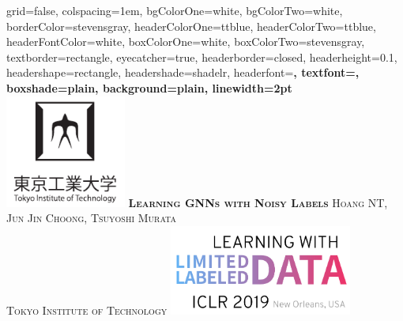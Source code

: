 \documentclass[portrait,final,a0paper,fontscale=0.365]{baposter}
\begin{document}


\begin{poster}%
  {
  grid=false,
  colspacing=1em,
  bgColorOne=white,
  bgColorTwo=white,
  borderColor=stevensgray,
  headerColorOne=ttblue,
  headerColorTwo=ttblue,
  headerFontColor=white,
  boxColorOne=white,
  boxColorTwo=stevensgray,
  textborder=rectangle,
  eyecatcher=true,
  headerborder=closed,
  headerheight=0.1\textheight,
  headershape=rectangle,
  headershade=shadelr,
  headerfont=\Large\bf\textsc, %
  textfont={\setlength{\parindent}{1.5em}},
  boxshade=plain,
  background=plain,
  linewidth=2pt
  }
  {%
    \includegraphics[height=10.0em]{img/tokyotech_logo}
  }
  {\bf \Huge \textsc{Learning GNNs with Noisy Labels} }
  {\vspace{0.5em} \textsc{ Hoang NT, Jun Jin Choong, Tsuyoshi Murata \\ \vspace{0.2em} Tokyo Institute of Technology}}
  {%
    \includegraphics[height=8.0em]{img/lld_logo}
  }


\end{poster}
\end{document}
